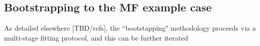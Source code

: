 \subsection{Bootstrapping to the MF example case}

As detailed elsewhere [TBD/refs], the ``bootstapping" methodology proceeds via a multi-stage fitting protocol, and this can be further iterated
